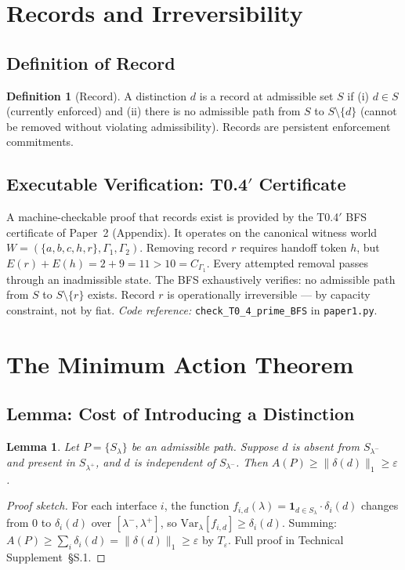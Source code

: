 \documentclass[11pt]{article}
\newcommand{\coderef}[2]{\smallskip\noindent\textit{Code reference:} \texttt{#1} in \texttt{#2}.}
\newtheorem{lemma}[theorem]{Lemma}
\theoremstyle{definition}
\newtheorem{definition}[theorem]{Definition}
\begin{document}
\section{Records and Irreversibility}\label{sec:records}

\subsection{Definition of Record}
\begin{definition}[Record]
A distinction $d$ is a record at admissible set $S$ if (i) $d \in S$ (currently enforced) and (ii) there is no admissible path from $S$ to $S \setminus \{d\}$ (cannot be removed without violating admissibility).  Records are persistent enforcement commitments.
\end{definition}

\subsection{Executable Verification: T0.4$'$ Certificate}
A machine-checkable proof that records exist is provided by the T0.4$'$ BFS certificate of Paper~2 (Appendix).  It operates on the canonical witness world $W = (\{a, b, c, h, r\}, \Gamma_1, \Gamma_2)$.  Removing record $r$ requires handoff token $h$, but $E(r) + E(h) = 2 + 9 = 11 > 10 = C_{\Gamma_1}$.  Every attempted removal passes through an inadmissible state.  The BFS exhaustively verifies: no admissible path from $S$ to $S \setminus \{r\}$ exists.  Record $r$ is operationally irreversible --- by capacity constraint, not by fiat.
\coderef{check\_T0\_4\_prime\_BFS}{paper1.py}

\section{The Minimum Action Theorem}\label{sec:mintheorem}

\subsection{Lemma: Cost of Introducing a Distinction}
\begin{lemma}\label{lem:minL}
Let $P = \{S_\lambda\}$ be an admissible path.  Suppose $d$ is absent from $S_{\lambda^-}$ and present in $S_{\lambda^+}$, and $d$ is independent of $S_{\lambda^-}$.  Then $A(P) \ge \|\delta(d)\|_1 \ge \varepsilon$.
\end{lemma}

\begin{proof}[Proof sketch]
For each interface $i$, the function $f_{i,d}(\lambda) = \mathbf{1}_{d \in S_\lambda} \cdot \delta_i(d)$ changes from $0$ to $\delta_i(d)$ over $[\lambda^-, \lambda^+]$, so $\mathrm{Var}_\lambda[f_{i,d}] \ge \delta_i(d)$.  Summing: $A(P) \ge \sum_i \delta_i(d) = \|\delta(d)\|_1 \ge \varepsilon$ by $T_\varepsilon$.  Full proof in Technical Supplement~\S S.1.
\end{proof}
\end{document}
